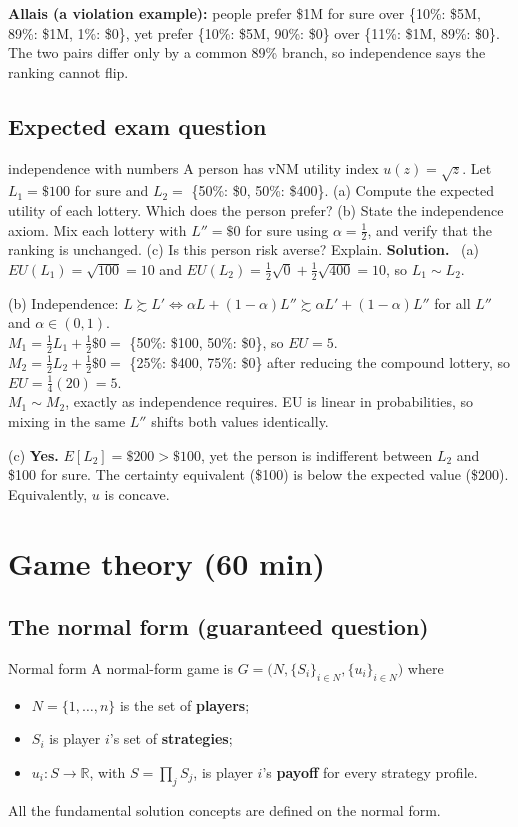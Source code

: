 \documentclass[11pt]{article}
\newcommand{\soln}{\tcblower\textbf{Solution.}\ }
\begin{document}
\textbf{Allais (a violation example):} people prefer \$1M for sure over \{10\%: \$5M, 89\%: \$1M, 1\%: \$0\}, yet prefer \{10\%: \$5M, 90\%: \$0\} over \{11\%: \$1M, 89\%: \$0\}. The two pairs differ only by a common 89\% branch, so independence says the ranking cannot flip.


\subsection*{Expected exam question}
\begin{examq}{independence with numbers}
A person has vNM utility index $u(z)=\sqrt z$. Let $L_1=\$100$ for sure and $L_2=$ \{50\%: \$0, 50\%: \$400\}.
(a) Compute the expected utility of each lottery. Which does the person prefer?
(b) State the independence axiom. Mix each lottery with $L''=\$0$ for sure using $\alpha=\tfrac12$, and verify that the ranking is unchanged.
(c) Is this person risk averse? Explain.
\soln
(a) $EU(L_1)=\sqrt{100}=10$ and $EU(L_2)=\tfrac12\sqrt0+\tfrac12\sqrt{400}=10$, so $L_1\sim L_2$.

(b) Independence: $L\succsim L'\iff\alpha L+(1-\alpha)L''\succsim\alpha L'+(1-\alpha)L''$ for all $L''$ and $\alpha\in(0,1)$.\\
$M_1=\tfrac12L_1+\tfrac12\$0=$ \{50\%: \$100, 50\%: \$0\}, so $EU=5$.\\
$M_2=\tfrac12L_2+\tfrac12\$0=$ \{25\%: \$400, 75\%: \$0\} after reducing the compound lottery, so $EU=\tfrac14(20)=5$.\\
$M_1\sim M_2$, exactly as independence requires. EU is linear in probabilities, so mixing in the same $L''$ shifts both values identically.

(c) \textbf{Yes.} $E[L_2]=\$200>\$100$, yet the person is indifferent between $L_2$ and \$100 for sure. The certainty equivalent (\$100) is below the expected value (\$200). Equivalently, $u$ is concave.
\end{examq}

\section{Game theory (60 min)}

\subsection{The normal form (guaranteed question)}
\begin{defbox}{Normal form}
A normal-form game is $G=\big(N,\{S_i\}_{i\in N},\{u_i\}_{i\in N}\big)$ where
\begin{itemize}
\item $N=\{1,\dots,n\}$ is the set of \textbf{players};
\item $S_i$ is player $i$'s set of \textbf{strategies};
\item $u_i:S\to\mathbb{R}$, with $S=\prod_j S_j$, is player $i$'s \textbf{payoff} for every strategy profile.
\end{itemize}
All the fundamental solution concepts are defined on the normal form.
\end{defbox}
\end{document}
